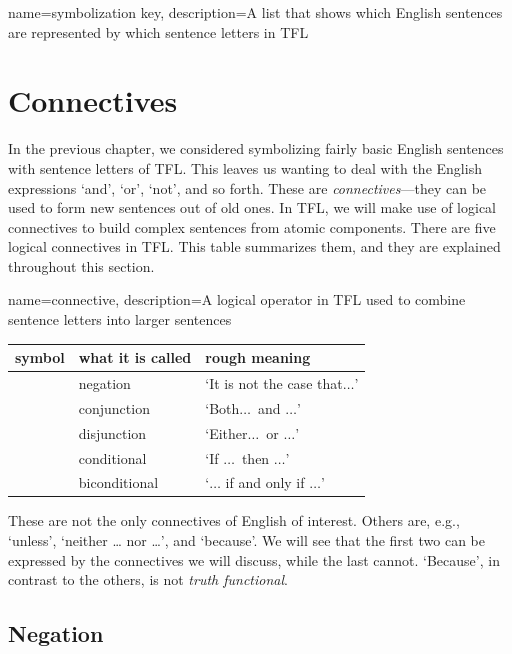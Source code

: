 {
name=symbolization key,
description={A list that shows which English sentences are represented by which \glspl{sentence letter} in TFL}
}

\chapter{Connectives}
\label{s:TFLConnectives}

In the previous chapter, we considered symbolizing fairly basic English sentences with sentence letters of TFL. This leaves us wanting to deal with the English expressions `and', `or', `not', and so forth. These are \emph{connectives}---they can be used to form new sentences out of old ones. In TFL, we will make use of logical connectives to build complex sentences from atomic components. There are five logical connectives in TFL. This table summarizes them, and they are explained throughout this section.

{
name=connective,
description={A logical operator in TFL used to combine \glspl{sentence letter} into larger sentences}
}
	\begin{table}[h]
	\centering
	\begin{tabular}{l l l}
	
	\textbf{symbol}&\textbf{what it is called}&\textbf{rough meaning}\\
	\hline
	\enot&negation&`It is not the case that$\ldots$'\\
	\eand&conjunction&`Both$\ldots$\ and $\ldots$'\\
	\eor&disjunction&`Either$\ldots$\ or $\ldots$'\\
	\eif&conditional&`If $\ldots$\ then $\ldots$'\\
	\eiff&biconditional&`$\ldots$ if and only if $\ldots$'\\
	
	\end{tabular}
	\end{table}

These are not the only connectives of English of interest. Others are, e.g., `unless', `neither \dots{} nor \dots', and `because'. We will see that the first two can be expressed by the connectives we will discuss, while the last cannot. `Because', in contrast to the others, is not \emph{truth functional}.

\section{Negation}

